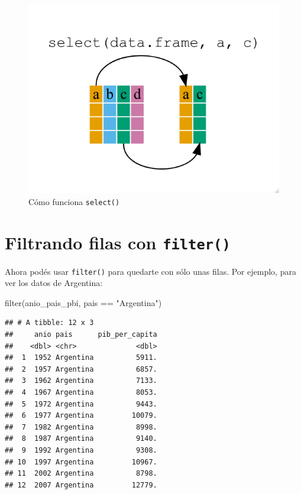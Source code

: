\documentclass[
  openany]{book}
\newenvironment{Shaded}{\begin{snugshade}}{\end{snugshade}}
\newcommand{\FunctionTok}[1]{\textcolor[rgb]{0.00,0.00,0.00}{#1}}
\newcommand{\NormalTok}[1]{#1}
\newcommand{\SpecialCharTok}[1]{\textcolor[rgb]{0.00,0.00,0.00}{#1}}
\newcommand{\StringTok}[1]{\textcolor[rgb]{0.31,0.60,0.02}{#1}}
\begin{document}
\begin{figure}
\centering
\includegraphics{img/dplyr-select.png}
\caption{Cómo funciona \texttt{select()}}
\end{figure}

\hypertarget{filtrando-filas-con-filter}{%
\section{\texorpdfstring{Filtrando filas con \texttt{filter()}}{Filtrando filas con filter()}}\label{filtrando-filas-con-filter}}

Ahora podés usar \texttt{filter()} para quedarte con sólo unas filas.
Por ejemplo, para ver los datos de Argentina:

\begin{Shaded}
\begin{Highlighting}[]
\FunctionTok{filter}\NormalTok{(anio\_pais\_pbi, pais }\SpecialCharTok{==} \StringTok{"Argentina"}\NormalTok{)}
\end{Highlighting}
\end{Shaded}

\begin{verbatim}
## # A tibble: 12 x 3
##     anio pais      pib_per_capita
##    <dbl> <chr>              <dbl>
##  1  1952 Argentina          5911.
##  2  1957 Argentina          6857.
##  3  1962 Argentina          7133.
##  4  1967 Argentina          8053.
##  5  1972 Argentina          9443.
##  6  1977 Argentina         10079.
##  7  1982 Argentina          8998.
##  8  1987 Argentina          9140.
##  9  1992 Argentina          9308.
## 10  1997 Argentina         10967.
## 11  2002 Argentina          8798.
## 12  2007 Argentina         12779.
\end{verbatim}
\end{document}

